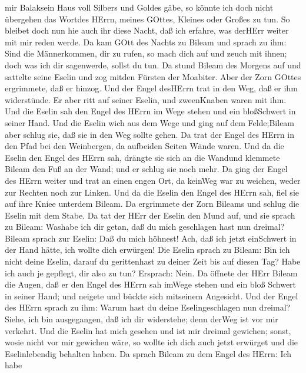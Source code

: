 mir Balaksein Haus voll Silbers und Goldes gäbe, so könnte ich doch
nicht übergehen das Wortdes HErrn, meines GOttes, Kleines oder Großes zu
tun.  So bleibet doch nun hie auch ihr diese Nacht, daß ich
erfahre, was derHErr weiter mit mir reden werde.  Da kam
GOtt des Nachts zu Bileam und sprach zu ihm: Sind die Männerkommen, dir
zu rufen, so mach dich auf und zeuch mit ihnen; doch was ich dir
sagenwerde, sollst du tun.  Da stund Bileam des Morgens auf
und sattelte seine Eselin und zog mitden Fürsten der Moabiter.
 Aber der Zorn GOttes ergrimmete, daß er hinzog. Und der
Engel desHErrn trat in den Weg, daß er ihm widerstünde. Er aber ritt auf
seiner Eselin, und zweenKnaben waren mit ihm.  Und die
Eselin sah den Engel des HErrn im Wege stehen und ein bloßSchwert in
seiner Hand. Und die Eselin wich aus dem Wege und ging auf dem
Felde;Bileam aber schlug sie, daß sie in den Weg sollte gehen.
 Da trat der Engel des HErrn in den Pfad bei den
Weinbergen, da aufbeiden Seiten Wände waren.  Und da die
Eselin den Engel des HErrn sah, drängte sie sich an die Wandund klemmete
Bileam den Fuß an der Wand; und er schlug sie noch mehr. 
Da ging der Engel des HErrn weiter und trat an einen engen Ort, da
keinWeg war zu weichen, weder zur Rechten noch zur Linken. 
Und da die Eselin den Engel des HErrn sah, fiel sie auf ihre Kniee
unterdem Bileam. Da ergrimmete der Zorn Bileams und schlug die Eselin
mit dem Stabe.  Da tat der HErr der Eselin den Mund auf,
und sie sprach zu Bileam: Washabe ich dir getan, daß du mich geschlagen
hast nun dreimal?  Bileam sprach zur Eselin: Daß du mich
höhnest! Ach, daß ich jetzt einSchwert in der Hand hätte, ich wollte
dich erwürgen!  Die Eselin sprach zu Bileam: Bin ich nicht
deine Eselin, darauf du gerittenhast zu deiner Zeit bis auf diesen Tag?
Habe ich auch je gepflegt, dir also zu tun? Ersprach: Nein.
 Da öffnete der HErr Bileam die Augen, daß er den Engel des
HErrn sah imWege stehen und ein bloß Schwert in seiner Hand; und neigete
und bückte sich mitseinem Angesicht.  Und der Engel des
HErrn sprach zu ihm: Warum hast du deine Eselingeschlagen nun dreimal?
Siehe, ich bin ausgegangen, daß ich dir widerstehe; denn derWeg ist vor
mir verkehrt.  Und die Eselin hat mich gesehen und ist mir
dreimal gewichen; sonst, wosie nicht vor mir gewichen wäre, so wollte
ich dich auch jetzt erwürget und die Eselinlebendig behalten haben.
 Da sprach Bileam zu dem Engel des HErrn: Ich habe
